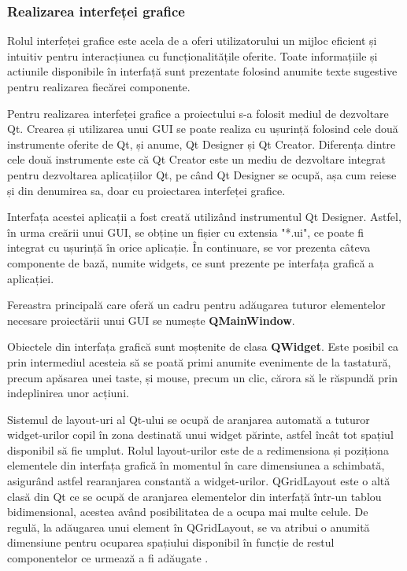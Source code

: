 \documentclass[12pt]{article}
\begin{document}
\subsubsection{Realizarea interfeței grafice}

Rolul interfeței grafice este acela de a oferi utilizatorului un mijloc eficient și intuitiv pentru interacțiunea cu funcționalit\u{a}țile oferite. Toate informațiile și actiunile disponibile \^{i}n interfaț\u{a} sunt prezentate folosind anumite texte sugestive pentru realizarea fiec\u{a}rei componente.

Pentru realizarea interfeței grafice a proiectului s-a folosit mediul de dezvoltare Qt. Crearea și utilizarea unui GUI se poate realiza cu ușurinț\u{a} folosind cele dou\u{a} instrumente oferite de Qt, și anume, Qt Designer și Qt Creator. Diferența dintre cele dou\u{a} instrumente este c\u{a} Qt Creator este un mediu de dezvoltare integrat pentru dezvoltarea aplicațiilor Qt, pe c\^{a}nd Qt Designer se ocup\u{a}, așa cum reiese și din denumirea sa, doar cu proiectarea interfeței grafice.

Interfața acestei aplicații a fost creat\u{a} utiliz\^{a}nd instrumentul Qt Designer. Astfel, \^{i}n urma cre\u{a}rii unui GUI, se obține un fișier cu extensia "*.ui", ce poate fi integrat cu ușurinț\u{a} \^{i}n orice aplicație. \^{I}n continuare, se vor prezenta c\^{a}teva componente de baz\u{a}, numite widgets, ce sunt prezente pe interfața grafic\u{a} a aplicației.

Fereastra principal\u{a} care ofer\u{a} un cadru pentru ad\u{a}ugarea tuturor elementelor necesare proiect\u{a}rii unui GUI se numește \textbf{QMainWindow}.

Obiectele din interfața grafic\u{a} sunt moștenite de clasa \textbf{QWidget}. Este posibil ca prin intermediul acesteia s\u{a} se poat\u{a} primi anumite evenimente de la tastatur\u{a}, precum ap\u{a}sarea unei taste, și mouse, precum un clic, c\u{a}rora s\u{a} le r\u{a}spund\u{a} prin indeplinirea unor acțiuni.

Sistemul de layout-uri al Qt-ului se ocup\u{a} de aranjarea automat\u{a} a tuturor widget-urilor copil \^{i}n zona destinat\u{a} unui widget p\u{a}rinte, astfel \^{i}nc\^{a}t tot spațiul disponibil s\u{a} fie umplut. Rolul layout-urilor este de a redimensiona și poziționa elementele din interfața grafic\u{a} \^{i}n momentul \^{i}n care dimensiunea a schimbat\u{a}, asigur\^{a}nd astfel rearanjarea constant\u{a} a widget-urilor. QGridLayout este o alt\u{a} clas\u{a} din Qt ce se ocup\u{a} de aranjarea elementelor din interfaț\u{a} \^{i}ntr-un tablou bidimensional, acestea av\^{a}nd posibilitatea de a ocupa mai multe celule. De regul\u{a}, la ad\u{a}ugarea unui element \^{i}n QGridLayout, se va atribui o anumit\u{a} dimensiune pentru ocuparea spațiului disponibil \^{i}n funcție de restul componentelor ce urmeaz\u{a} a fi ad\u{a}ugate \cite{widgets}.
\end{document}
